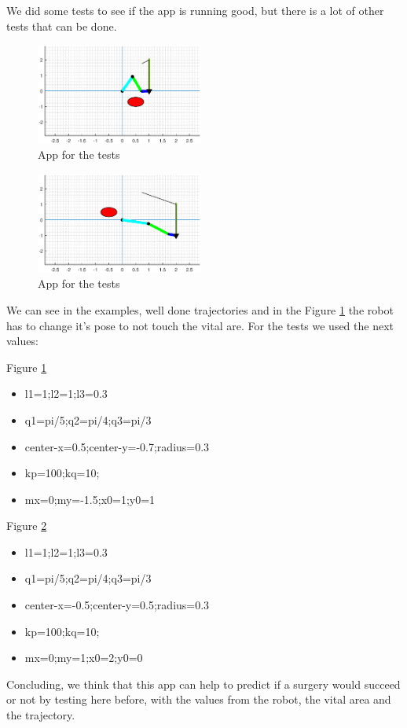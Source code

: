 We did some tests to see if the app is running good, but there is a lot of other tests that can be done.

\begin{figure}[H]
    \centering
    \includegraphics[width=0.49\textwidth]{imgs/f1.eps}
    \caption{App for the tests}
    \label{fig:f1}
\end{figure}

\begin{figure}[H]
    \centering
    \includegraphics[width=0.49\textwidth]{imgs/f2.eps}
    \caption{App for the tests}
    \label{fig:f2}
\end{figure}

We can see in the examples, well done trajectories and in the Figure \ref{fig:f1} the robot has to change it's pose to not touch the vital are.
For the tests we used the next values:

Figure \ref{fig:f1}
\begin{itemize}
    \item l1=1;l2=1;l3=0.3
    \item q1=pi/5;q2=pi/4;q3=pi/3
    \item center-x=0.5;center-y=-0.7;radius=0.3
    \item kp=100;kq=10;
    \item mx=0;my=-1.5;x0=1;y0=1
\end{itemize}

Figure \ref{fig:f2}
\begin{itemize}
    \item l1=1;l2=1;l3=0.3
    \item q1=pi/5;q2=pi/4;q3=pi/3
    \item center-x=-0.5;center-y=0.5;radius=0.3
    \item kp=100;kq=10;
    \item mx=0;my=1;x0=2;y0=0
\end{itemize}

Concluding, we think that this app can help to predict if a surgery would succeed or not by testing here before, with the values from the robot, the vital area and the trajectory.